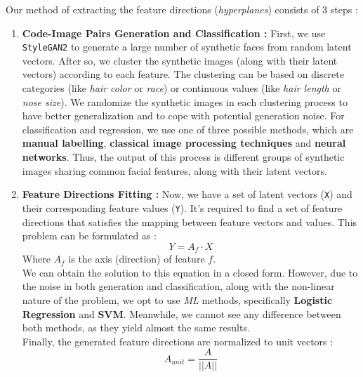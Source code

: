 Our method of extracting the feature directions (\emph{hyperplanes}) consists of $3$ steps :
\begin{enumerate}
    \item \textbf{Code-Image Pairs Generation and Classification :} First, we use \texttt{StyleGAN2} to generate a large number of synthetic faces from random latent vectors. After so, we cluster the synthetic images (along with their latent vectors) according to each feature. The clustering can be based on discrete categories (like \emph{hair color} or \emph{race}) or continuous values (like \emph{hair length} or \emph{nose size}). We randomize the synthetic images in each clustering process to have better generalization and to cope with potential generation noise. For classification and regression, we use one of three possible methods, which are \textbf{manual labelling}, \textbf{classical image processing techniques} and \textbf{neural networks}. Thus, the output of this process is different groups of synthetic images sharing common facial features, along with their latent vectors.
    
    \item \textbf{Feature Directions Fitting :} Now, we have a set of latent vectors (\texttt{X}) and their corresponding feature values (\texttt{Y}). It's required to find a set of feature directions that satisfies the mapping between feature vectors and values. This problem can be formulated as :
    \begin{equation}
        Y = A_f \cdot X
    \end{equation}
    Where $A_f$ is the axis (direction) of feature $f$. \\
    We can obtain the solution to this equation in a closed form. However, due to the noise in both generation and classification, along with the non-linear nature of the problem, we opt to use \emph{ML} methods, specifically \textbf{Logistic Regression} and \textbf{SVM}. Meanwhile, we cannot see any difference between both methods, as they yield almost the same results. \\
    Finally, the generated feature directions are normalized to unit vectors :
    \begin{equation}
        A_{unit} = \frac{A}{||A||}
    \end{equation}
    

\end{enumerate}
